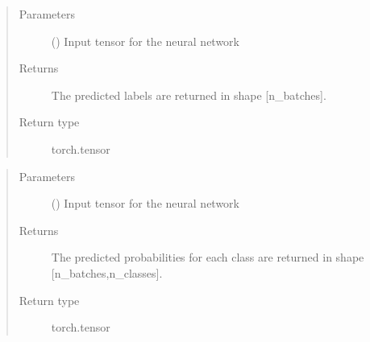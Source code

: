 \documentclass[letterpaper,10pt,english]{sphinxmanual}
\begin{document}
\begin{fulllineitems}

\begin{fulllineitems}
\label{\detokenize{models:models.FCN4.model.predict}}
\pysigstartsignatures
{}
\pysigstopsignatures\begin{quote}\begin{description}
\item[{Parameters}] \leavevmode
\sphinxAtStartPar
{} () \textendash{} Input tensor for the neural network

\item[{Returns}] \leavevmode
\sphinxAtStartPar
{} \textendash{} The predicted labels are returned in shape {[}n\_batches{]}.

\item[{Return type}] \leavevmode
\sphinxAtStartPar
torch.tensor

\end{description}\end{quote}

\end{fulllineitems}


\begin{fulllineitems}
\label{\detokenize{models:models.FCN4.model.prob}}
\pysigstartsignatures
{}
\pysigstopsignatures\begin{quote}\begin{description}
\item[{Parameters}] \leavevmode
\sphinxAtStartPar
{} () \textendash{} Input tensor for the neural network

\item[{Returns}] \leavevmode
\sphinxAtStartPar
The predicted probabilities for each class are returned in shape {[}n\_batches,n\_classes{]}.

\item[{Return type}] \leavevmode
\sphinxAtStartPar
torch.tensor

\end{description}\end{quote}


\end{fulllineitems}
\end{fulllineitems}
\end{document}
